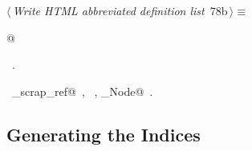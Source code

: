 \documentclass[a4paper]{report}
\begin{document}
\begin{flushleft} \small
\begin{minipage}{\linewidth}\label{scrap156}\raggedright\small
{} $\langle\,${\it Write HTML abbreviated definition list}\nobreak\ {\footnotesize {78b}}$\,\rangle\equiv$
\vspace{-1ex}
\begin{list}{}{} \item
\mbox{}@{\NWsep}
\end{list}
\vspace{-1.5ex}
\footnotesize
\begin{list}{}{\setlength{\itemsep}{-\parsep}\setlength{\itemindent}{-\leftmargin}}
\item \NWtxtMacroRefIn\ .
\item \NWtxtIdentsUsed\nobreak\  \verb@display_scrap_ref@\nobreak\ , \verb@fputs@\nobreak\ , \verb@Scrap_Node@\nobreak\ .
\item{}
\end{list}
\end{minipage}\vspace{4ex}
\end{flushleft}
\subsection{Generating the Indices}
\end{document}
